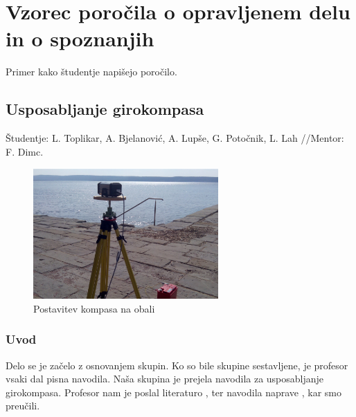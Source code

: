 %
\chapter{Vzorec poročila o opravljenem delu in o spoznanjih}
\label{ch:Poroc_Vzorec} %

Primer kako študentje napišejo poročilo.

\section{Usposabljanje girokompasa}	
\label{sec:1}
Študentje: L. Toplikar, A. Bjelanović, A. Lupše, G. Potočnik, L. Lah //Mentor: F. Dimc.

\begin{figure}
	\centering
	\includegraphics[height=5cm]{Vaje/VzorecPoroc/figs/Gyro_obala.pdf}
	\caption{Postavitev kompasa na obali}
	\label{fig:Gyro_obala}       %
\end{figure}

\subsection{Uvod}
Delo se je začelo z osnovanjem skupin. Ko so bile skupine sestavljene, je profesor vsaki dal pisna navodila. Naša skupina je prejela navodila za usposabljanje girokompasa. Profesor nam je poslal literaturo  \cite{Girokompas_2012}, \cite{Girokompas_2013} ter navodila naprave \cite{Gyro_Man}, kar smo preučili.

